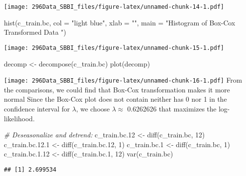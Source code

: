 \documentclass[
]{article}
\newenvironment{Shaded}{\begin{snugshade}}{\end{snugshade}}
\newcommand{\AttributeTok}[1]{\textcolor[rgb]{0.77,0.63,0.00}{#1}}
\newcommand{\CommentTok}[1]{\textcolor[rgb]{0.56,0.35,0.01}{\textit{#1}}}
\newcommand{\DecValTok}[1]{\textcolor[rgb]{0.00,0.00,0.81}{#1}}
\newcommand{\FloatTok}[1]{\textcolor[rgb]{0.00,0.00,0.81}{#1}}
\newcommand{\FunctionTok}[1]{\textcolor[rgb]{0.00,0.00,0.00}{#1}}
\newcommand{\NormalTok}[1]{#1}
\newcommand{\OtherTok}[1]{\textcolor[rgb]{0.56,0.35,0.01}{#1}}
\newcommand{\StringTok}[1]{\textcolor[rgb]{0.31,0.60,0.02}{#1}}
\begin{document}
\texttt{[image: 296Data\_SBBI\_files/figure-latex/unnamed-chunk-14-1.pdf]}

\begin{Shaded}
\begin{Highlighting}[]
\FunctionTok{hist}\NormalTok{(c\_train.bc, }\AttributeTok{col =} \StringTok{"light blue"}\NormalTok{, }\AttributeTok{xlab =} \StringTok{""}\NormalTok{, }\AttributeTok{main =} \StringTok{"Histogram of Box{-}Cox Transformed Data "}\NormalTok{)}
\end{Highlighting}
\end{Shaded}

\texttt{[image: 296Data\_SBBI\_files/figure-latex/unnamed-chunk-15-1.pdf]}

\begin{Shaded}
\begin{Highlighting}[]
\NormalTok{decomp }\OtherTok{\textless{}{-}} \FunctionTok{decompose}\NormalTok{(c\_train.bc)}
\FunctionTok{plot}\NormalTok{(decomp)}
\end{Highlighting}
\end{Shaded}

\texttt{[image: 296Data\_SBBI\_files/figure-latex/unnamed-chunk-16-1.pdf]}
From the comparisons, we could find that Box-Cox transformation makes it
more normal Since the Box-Cox plot does not contain neither has 0 nor 1
in the confidence interval for \(\lambda\), we choose
\(\lambda \approx\) 0.6262626 that maximizes the log-likelihood.

\begin{Shaded}
\begin{Highlighting}[]
\CommentTok{\# Deseasonalize and detrend:}
\NormalTok{c\_train.bc}\FloatTok{.12} \OtherTok{\textless{}{-}} \FunctionTok{diff}\NormalTok{(c\_train.bc, }\DecValTok{12}\NormalTok{)}
\NormalTok{c\_train.bc.}\FloatTok{12.1} \OtherTok{\textless{}{-}} \FunctionTok{diff}\NormalTok{(c\_train.bc}\FloatTok{.12}\NormalTok{, }\DecValTok{1}\NormalTok{)}
\NormalTok{c\_train.bc}\FloatTok{.1} \OtherTok{\textless{}{-}} \FunctionTok{diff}\NormalTok{(c\_train.bc, }\DecValTok{1}\NormalTok{)}
\NormalTok{c\_train.bc.}\FloatTok{1.12} \OtherTok{\textless{}{-}} \FunctionTok{diff}\NormalTok{(c\_train.bc}\FloatTok{.1}\NormalTok{, }\DecValTok{12}\NormalTok{)}
\FunctionTok{var}\NormalTok{(c\_train.bc)}
\end{Highlighting}
\end{Shaded}

\begin{verbatim}
## [1] 2.699534
\end{verbatim}
\end{document}
